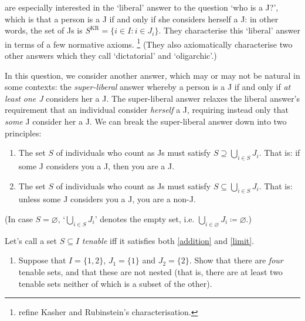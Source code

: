 \begin{exercise}
\begin{itemize}
	\end{itemize}

	\textcite{KasherRubinstein1997} are especially interested in the `liberal' answer to the question `who is a J?', which is that a person is a J if and only if she considers herself a J: in other words, the set of Js is $S^\text{KR} = \{ i \in I : i \in J_i \}$. They characterise this `liberal' answer in terms of a few normative axioms.%
		\footnote{\textcite{SungDimitrov2005} refine Kasher and Rubinstein's characterisation.}
	(They also axiomatically characterise two other answers which they call `dictatorial' and `oligarchic'.)

	In this question, we consider another answer, which may or may not be natural in some contexts: the \emph{super-liberal} answer whereby a person is a J if and only if \emph{at least one J} considers her a J. The super-liberal answer relaxes the liberal answer's requirement that an individual consider \emph{herself} a J, requiring instead only that \emph{some} J consider her a J. We can break the super-liberal answer down into two principles:

	\begin{enumerate}[label=(\Alph*)]

		\item \label{addition} The set $S$ of individuals who count as Js must satisfy $S \supseteq \bigcup_{i \in S} J_i$. That is: if some J considers you a J, then you are a J.

		\item \label{limit} The set $S$ of individuals who count as Js must satisfy $S \subseteq \bigcup_{i \in S} J_i$. That is: unless some J considers you a J, you are a non-J.

	\end{enumerate}
	(In case $S = \varnothing$, `$\bigcup_{i \in S} J_i$' denotes the empty set, i.e. $\bigcup_{i \in \varnothing} J_i \coloneqq \varnothing$.)

	Let's call a set $S \subseteq I$ \emph{tenable} iff it satisfies both \ref{addition} and \ref{limit}.

	\begin{enumerate}[label=(\alph*)]

		\item Suppose that $I = \{1,2\}$, $J_1 = \{1\}$ and $J_2 = \{2\}$. Show that there are \emph{four} tenable sets, and that these are not nested (that is, there are at least two tenable sets neither of which is a subset of the other).


\end{enumerate}
\end{exercise}
